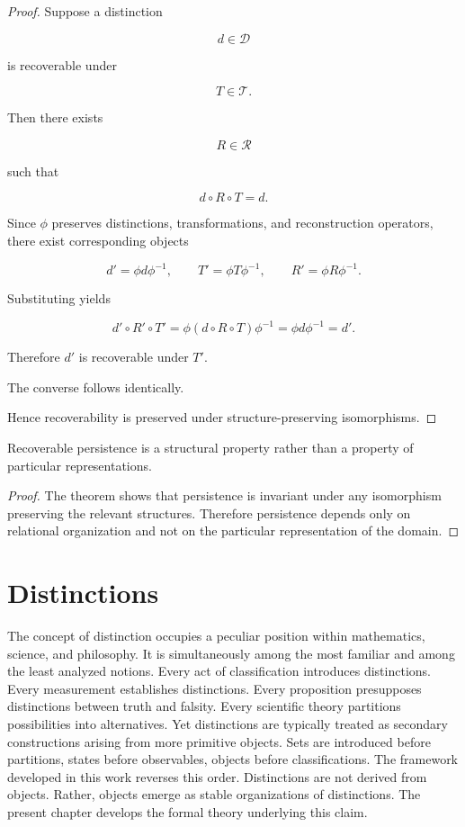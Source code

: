 \documentclass[12pt,oneside]{article}
\theoremstyle{definition}
\begin{document}
\begin{proof}

Suppose a distinction

\[
d\in\mathcal D
\]

is recoverable under

\[
T\in\mathcal T.
\]

Then there exists

\[
R\in\mathcal R
\]

such that

\[
d\circ R\circ T=d.
\]

Since \(\phi\) preserves distinctions, transformations, and reconstruction operators, there exist corresponding objects

\[
d'=\phi d\phi^{-1},
\qquad
T'=\phi T\phi^{-1},
\qquad
R'=\phi R\phi^{-1}.
\]

Substituting yields

\[
d'
\circ
R'
\circ
T'
=
\phi
(d\circ R\circ T)
\phi^{-1}
=
\phi d\phi^{-1}
=
d'.
\]

Therefore \(d'\) is recoverable under \(T'\).

The converse follows identically.

Hence recoverability is preserved under structure-preserving isomorphisms.

\end{proof}

\begin{corollary}

Recoverable persistence is a structural property rather than a property of particular representations.

\end{corollary}

\begin{proof}

The theorem shows that persistence is invariant under any isomorphism preserving the relevant structures. Therefore persistence depends only on relational organization and not on the particular representation of the domain.

\end{proof}

\section{Distinctions}

The concept of distinction occupies a peculiar position within mathematics, science, and philosophy. It is simultaneously among the most familiar and among the least analyzed notions. Every act of classification introduces distinctions. Every measurement establishes distinctions. Every proposition presupposes distinctions between truth and falsity. Every scientific theory partitions possibilities into alternatives. Yet distinctions are typically treated as secondary constructions arising from more primitive objects. Sets are introduced before partitions, states before observables, objects before classifications. The framework developed in this work reverses this order. Distinctions are not derived from objects. Rather, objects emerge as stable organizations of distinctions. The present chapter develops the formal theory underlying this claim.
\end{document}
